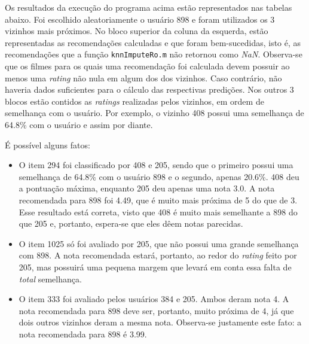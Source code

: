 \vspace{12pt}
 
Os resultados da execução do programa acima estão representados nas tabelas
abaixo. Foi escolhido aleatoriamente o usuário 898 e foram utilizados os 3
vizinhos mais próximos. No bloco superior da coluna da esquerda, estão
representadas as recomendações calculadas e que foram bem-sucedidas, isto é, as
recomendações que a função \texttt{knnImputeRo.m} não retornou como
\textit{NaN}. Observa-se que os filmes para os quais uma recomendação foi
calculada devem possuir ao menos uma \textit{rating} não nula em algum dos
dos vizinhos. Caso contrário, não haveria dados suficientes para o cálculo das
respectivas predições. Nos outros 3 blocos estão contidos as \textit{ratings}
realizadas pelos vizinhos, em ordem de semelhança com o usuário. Por exemplo, o
vizinho 408 possui uma semelhança de 64.8\% com o usuário e assim por diante.

\vspace{12pt}
 
É possível alguns fatos:

\begin{itemize}
  \item O item 294 foi classificado por 408 e 205, sendo que o primeiro possui
  uma semelhança de 64.8\% com o usuário 898 e o segundo, apenas 20.6\%. 408 deu
  a pontuação máxima, enquanto 205 deu apenas uma nota 3.0. A nota recomendada
  para 898 foi 4.49, que é muito mais próxima de 5 do que de 3. Esse resultado
  está correta, visto que 408 é muito mais semelhante a 898 do que 205 e,
  portanto, espera-se que eles dêem notas parecidas.

  \item  O item 1025 só foi avaliado por 205, que não possui uma grande
  semelhança com 898. A nota recomendada estará, portanto, ao redor do
  \textit{rating} feito por 205, mas possuirá uma pequena margem que levará em
  conta essa falta de \textit{total} semelhança.

  \item O item 333 foi avaliado pelos usuários 384 e 205. Ambos deram nota 4. A
  nota recomendada para 898 deve ser, portanto, muito próxima de 4, já que dois
  outros vizinhos deram a mesma nota. Observa-se justamente este fato: a nota
  recomendada para 898 é 3.99.
\end{itemize} 

